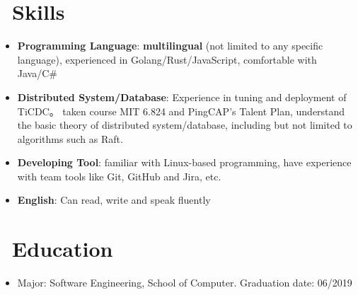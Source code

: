 \documentclass{resume}
\newcommand{\en}[1]{#1}
\newcommand{\zh}[1]{}
\begin{document}
\section{\faCogs\ \en{Skills}\zh{技能}}
\begin{itemize}[parsep=0.25ex]
      \item \en{\textbf{Programming Language}:
                  \textbf{multilingual} (not limited to any specific language),
                  experienced in Golang/Rust/JavaScript,
                  comfortable with Java/C#}
            \zh{\textbf{编程语言}:
                  \textbf{泛语言}（编程不受特定语言限制），
                  熟悉 Golang/Rust/JavaScript，
                  了解 Java/C# 等}

      \item \en{\textbf{Distributed System/Database}:
                  Experience in tuning and deployment of TiCDC。
                  taken course MIT 6.824 and PingCAP's Talent Plan,
                  understand the basic theory of distributed system/database,
                  including but not limited to algorithms such as Raft.}
            \zh{\textbf{分布式系统/数据库}:
                  有分布式系统 TiCDC 的调优开发以及部署经验。
                  自主学习了 MIT 6.824 和 PingCAP's Talent Plan 等课程，
                  了解分布式系统/数据库的基本理论，包括但不限于 Raft 等算法}

      \item \en{\textbf{Developing Tool}:
                  familiar with Linux-based programming,
                  have experience with team tools like Git, GitHub and Jira, etc.}
            \zh{\textbf{开发工具}:
                  熟悉 Linux，有 Git、GitHub 和 Jira 等团队协作工具的使用经验}

      \item \en{\textbf{English}:
                  Can read, write and speak fluently}
            \zh{\textbf{英语}:
                  可以熟练的听说读写}
\end{itemize}

\section{\faGraduationCap\ \en{Education}\zh{教育经历}}
\en{}
\zh{\datedsubsection{\textbf{重庆理工大学}, 本科}{2015/09 -- 2019/06}}
\begin{itemize}
      \item \en{Major: Software Engineering, School of Computer. Graduation date: 06/2019}
            \zh{软件工程，计算机学院，2019 年 6 月毕业}
\end{itemize}
\end{document}

